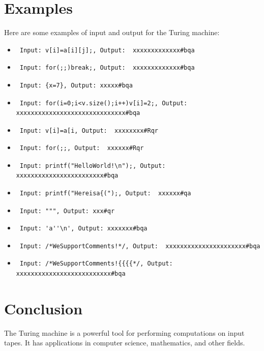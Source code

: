 \documentclass{article}
\begin{document}
\section{Examples}
Here are some examples of input and output for the Turing machine:
\begin{itemize}
    \item \begin{verbatim} Input: v[i]=a[i][j];, Output:  xxxxxxxxxxxxx#bqa \end{verbatim}
    \item \begin{verbatim} Input: for(;;)break;, Output:  xxxxxxxxxxxxx#bqa \end{verbatim}
    \item \begin{verbatim} Input: {x=7}, Output: xxxxx#bqa \end{verbatim}
    \item \begin{verbatim} Input: for(i=0;i<v.size();i++)v[i]=2;, Output: xxxxxxxxxxxxxxxxxxxxxxxxxxxxxx#bqa \end{verbatim}
    \item \begin{verbatim} Input: v[i]=a[i, Output:  xxxxxxxx#Rqr \end{verbatim}
    \item \begin{verbatim} Input: for(;;, Output:  xxxxxx#Rqr \end{verbatim}
    \item \begin{verbatim} Input: printf("HelloWorld!\n");, Output:   xxxxxxxxxxxxxxxxxxxxxxxx#bqa \end{verbatim}
    \item \begin{verbatim} Input: printf("Hereisa{(");, Output:  xxxxxx#qa\end{verbatim}
    \item \begin{verbatim} Input: """, Output: xxx#qr\end{verbatim}
    \item \begin{verbatim} Input: 'a''\n', Output: xxxxxxx#bqa\end{verbatim}
    \item \begin{verbatim} Input: /*WeSupportComments!*/, Output:  xxxxxxxxxxxxxxxxxxxxxx#bqa \end{verbatim}
    \item \begin{verbatim} Input: /*WeSupportComments!{{{{*/, Output:  xxxxxxxxxxxxxxxxxxxxxxxxxx#bqa \end{verbatim}
\end{itemize}

\section{Conclusion}
The Turing machine is a powerful tool for performing computations on input tapes. It has applications in computer science, mathematics, and other fields.
\end{document}
